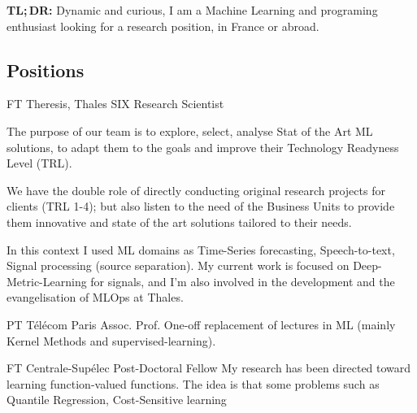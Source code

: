 \documentclass[10pt]{article} %
\begin{document}
\begin{center}
    \textbf{TL;\,DR:} Dynamic and curious, I am a Machine Learning and
    programing enthusiast looking for a research position, in France or abroad.
\end{center}
\medskip
\begin{paracol}{2}
%
%
\section{Positions}
%
%
%
%
%
{FT} %
{Theresis, Thales SIX} %
{Research Scientist} %
{The purpose of our team is to explore, select, analyse Stat of the Art
  ML solutions, to adapt them to the goals and improve their Technology
  Readyness Level (TRL). \par
  We have the double role of directly conducting original research
  projects for clients (TRL 1-4); but also listen to the need of the
  Business Units to provide them innovative and state of the art
  solutions tailored to their needs.  \par
  In this context I used ML domains as Time-Series forecasting,
  Speech-to-text, Signal processing (source separation). My current work
  is focused on Deep-Metric-Learning for signals, and I'm also involved in
  the development and the evangelisation of MLOps at Thales.}\par %
{PT} %
{T\'el\'ecom Paris} %
{Assoc. Prof.} %
{One-off replacement of lectures in ML (mainly Kernel Methods and
  supervised-learning).}\par
{} %
{FT} %
{Centrale-Sup\'elec} %
{Post-Doctoral Fellow} %
{My research has been directed toward learning function-valued functions. The
idea is that some problems such as Quantile Regression, Cost-Sensitive learning
}
\end{paracol}
\end{document}
